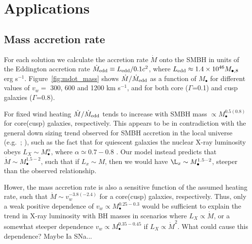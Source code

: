 \documentclass[usenatbib,fleqn]{mn2e}
\newcommand{\Mdot}{\dot{M}}
\newcommand{\Mbh}[1][]{M_{\bullet#1}}
\newcommand{\rIa}{r_{\rm Ia}}
\newcommand{\vwO}{v_{w}}
\begin{document}


\section{Applications}
\label{sec:applications}

\subsection{Mass accretion rate}
\label{sec:mdot}

For each solution we calculate the accretion rate $\dot{M}$ onto the
SMBH in units of the Eddington accretion rate $\dot{M}_{\rm edd}
\equiv L_{\rm edd}/0.1 c^{2}$, where $L_{\rm edd} \approx 1.4\times
10^{46}M_{\bullet,8}$ erg s$^{-1}$.  Figure~\ref{fig:mdot_mass} shows
$\dot{M}/\dot{M}_{\rm edd}$ as a function of $\Mbh$ for different
values of $\vwO =$ 300, 600 and 1200 km s$^{-1}$, and for both core
($\Gamma$=0.1) and cusp galaxies ($\Gamma$=0.8).

For fixed wind heating $\dot{M}/\dot{M}_{\rm edd}$ tends to increase
with SMBH mass $\propto M_{\bullet}^{0.5(0.8)}$ for core(cusp)
galaxies, respectively.  This appears to be in contradiction with the
general down sizing trend observed for SMBH accretion in the local
universe (e.g.~\citealt{Heckman+04}; \citealt{Gallo+08}), such as the
fact that for quiescent galaxies the nuclear X-ray luminosity obeys
$L_X \sim \Mbh^\alpha$, where $\alpha\simeq 0.7-0.8$
\citep{MillerGallo+:2014a}.  Our model instead predicts that $\Mdot
\sim \Mbh^{1.5-2}$, such that if $L_x\sim M$, then we would have $\L_x
\sim \Mbh^{1.5-2}$, steeper than the observed relationship.

Hower, the mass accretion rate is also a sensitive function of the assumed heating rate, such that $\dot{M}\sim\vwO^{-3.8(-2.4)}$ for a core(cusp) galaxies, respectively.  Thus, only a weak positive dependence of $v_{w} \propto M_{\bullet}^{0.25-0.3}$ would be sufficient to explain the trend in X-ray luminosity with BH masses in scenarios where $L_X \propto \dot{M}$, or a somewhat steeper dependence $v_{w} \propto M_{\bullet}^{0.35-0.45}$ if $L_{X} \propto \dot{M}^{2}$.  What could cause this dependence?  Maybe Ia SNa...
\end{document}
